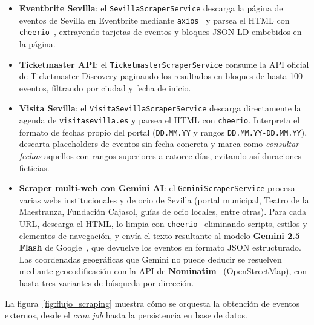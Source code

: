 \begin{itemize}
    \item \textbf{Eventbrite Sevilla}: el \texttt{SevillaScraperService} descarga la página de eventos de Sevilla en Eventbrite mediante \texttt{axios}~\cite{axios} y parsea el HTML con \texttt{cheerio}~\cite{cheerio}, extrayendo tarjetas de eventos y bloques JSON-LD embebidos en la página.
    \item \textbf{Ticketmaster API}: el \texttt{TicketmasterScraperService} consume la API oficial de Ticketmaster Discovery paginando los resultados en bloques de hasta 100 eventos, filtrando por ciudad y fecha de inicio.
    \item \textbf{Visita Sevilla}: el \texttt{VisitaSevillaScraperService} descarga directamente la agenda de \texttt{visitasevilla.es} y parsea el HTML con \texttt{cheerio}. Interpreta el formato de fechas propio del portal (\texttt{DD.MM.YY} y rangos \texttt{DD.MM.YY-DD.MM.YY}), descarta placeholders de eventos sin fecha concreta y marca como \textit{consultar fechas} aquellos con rangos superiores a catorce días, evitando así duraciones ficticias.
    \item \textbf{Scraper multi-web con Gemini AI}: el \texttt{GeminiScraperService} procesa varias webs institucionales y de ocio de Sevilla (portal municipal, Teatro de la Maestranza, Fundación Cajasol, guías de ocio locales, entre otras). Para cada URL, descarga el HTML, lo limpia con \texttt{cheerio}~\cite{cheerio} eliminando scripts, estilos y elementos de navegación, y envía el texto resultante al modelo \textbf{Gemini 2.5 Flash} de Google~\cite{gemini}, que devuelve los eventos en formato JSON estructurado. Las coordenadas geográficas que Gemini no puede deducir se resuelven mediante geocodificación con la API de \textbf{Nominatim}~\cite{nominatim} (OpenStreetMap), con hasta tres variantes de búsqueda por dirección.
\end{itemize}

La figura~\ref{fig:flujo_scraping} muestra cómo se orquesta la obtención de eventos externos, desde el \textit{cron job} hasta la persistencia en base de datos.

